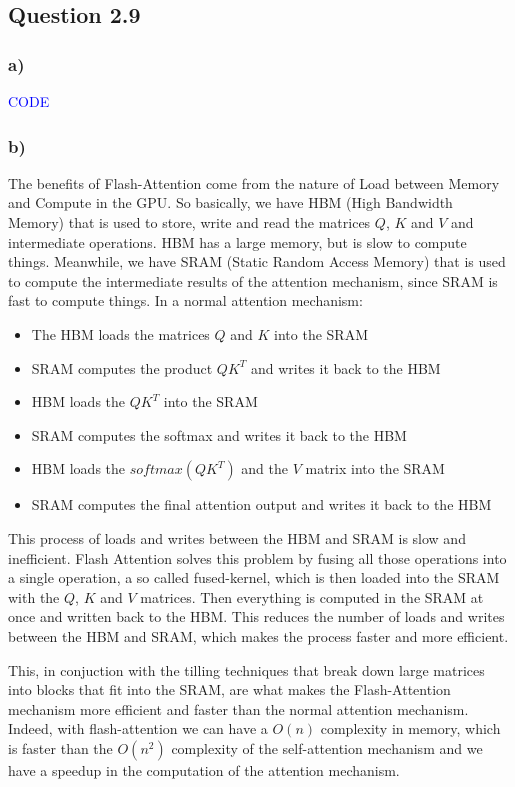 \documentclass{article}
\begin{document}
\subsection*{Question 2.9}

\subsubsection*{a)}

\textcolor{blue}{CODE}

\subsubsection*{b)}

The benefits of Flash-Attention come from the nature of Load between Memory and Compute in the GPU. So basically, we have HBM (High Bandwidth Memory)
that is used to store, write and read the matrices $Q$, $K$ and $V$ and intermediate operations. HBM has a large memory, but is slow to compute things. Meanwhile, we have
SRAM (Static Random Access Memory) that is used to compute the intermediate results of the attention mechanism, since SRAM is fast to compute things.
In a normal attention mechanism:

\begin{itemize}
    \item The HBM loads the matrices $Q$ and $K$ into the SRAM
    \item SRAM computes the product $QK^T$ and writes it back to the HBM
    \item HBM loads the $QK^T$ into the SRAM
    \item SRAM computes the softmax and writes it back to the HBM
    \item HBM loads the $softmax(QK^T)$ and the $V$ matrix into the SRAM
    \item SRAM computes the final attention output and writes it back to the HBM
\end{itemize}

This process of loads and writes between the HBM and SRAM is slow and inefficient.
Flash Attention solves this problem by fusing all those operations into a single operation,
a so called fused-kernel, which is then loaded into the SRAM with the $Q$, $K$ and $V$ matrices. Then everything is computed in the SRAM
at once and written back to the HBM. This reduces the number of loads and writes between the HBM and SRAM, which makes the process
faster and more efficient.

This, in conjuction with the tilling techniques that break down large matrices into blocks that fit into the SRAM, are
what makes the Flash-Attention mechanism more efficient and faster than the normal attention mechanism. Indeed,
with flash-attention we can have a $O(n)$ complexity in memory, which is faster than the $O(n^2)$ complexity of the self-attention mechanism
and we have a speedup in the computation of the attention mechanism.
\end{document}
